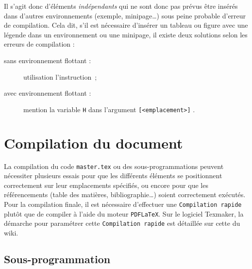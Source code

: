 \documentclass[a4paper, 11pt, twoside, fleqn]{memoir}
\begin{document}
Il s'agit donc d'éléments \emph{indépendants} qui ne sont donc pas prévus être insérés dans d'autres environnements (exemple, minipage\ldots) sous peine probable d'erreur de compilation. Cela dit, s'il est nécessaire d'insérer un tableau ou figure avec une légende dans un environnement ou une minipage, il existe deux solutions selon les erreurs de compilation :
\begin{description}
\item [sans environnement flottant :] utilisation l'instruction \texttt{} \,;
\item [avec environnement flottant :] mention la variable \texttt{H} dans l'argument \texttt{[<emplacement>]} .
\end{description}


	\section{Compilation du document}

La compilation du code \texttt{master.tex} ou des sous-programmations peuvent nécessiter plusieurs essais pour que les différents éléments se positionnent correctement sur leur emplacements spécifiés, ou encore pour que les référencements (table des matières, bibliographie\ldots) soient correctement exécutés.\\ 
Pour la compilation finale, il est nécessaire d'effectuer une \texttt{Compilation rapide} plutôt que de compiler à l'aide du moteur \texttt{PDFLaTeX}. Sur le logiciel Texmaker, la démarche pour paramétrer cette \texttt{Compilation rapide} est détaillée sur cette  du wiki.\\

	\subsection{Sous-programmation\label{subsec:sous-programmation}}
\end{document}
